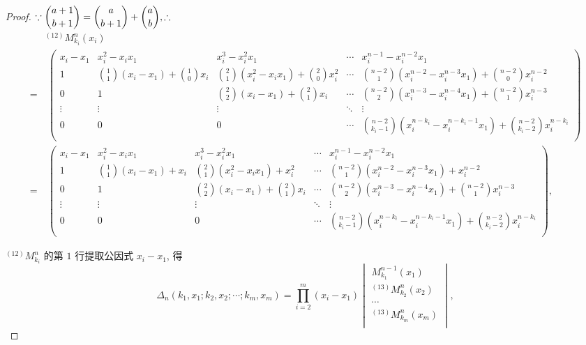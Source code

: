 \documentclass{ctexart}
\begin{document}
\begin{proof}
    $\because\dbinom{a+1}{b+1}=\dbinom{a}{b+1}+\dbinom{a}{b},\therefore$
    \begin{align*}
        & ^{(12)}M_{k_i}^n(x_i) \\
        = & \ \begin{pmatrix}
            x_i-x_1 & x_i^2-x_ix_1 & x_i^3-x_i^2x_1 & \cdots & x_i^{n-1}-x_i^{n-2}x_1 \\[4pt]
            1 & \binom{1}{1}(x_i-x_1)+\binom{1}{0}x_i & \binom{2}{1}(x_i^2-x_ix_1)+\binom{2}{0}x_i^2 & \cdots & \binom{n-2}{1}(x_i^{n-2}-x_i^{n-3}x_1)+\binom{n-2}{0}x_i^{n-2} \\[10pt]
            0 & 1 & \binom{2}{2}(x_i-x_1)+\binom{2}{1}x_i & \cdots & \binom{n-2}{2}(x_i^{n-3}-x_i^{n-4}x_1)+\binom{n-2}{1}x_i^{n-3} \\
            \vdots & \vdots & \vdots & \ddots & \vdots \\[4pt]
            0 & 0 & 0 & \cdots & \binom{n-2}{k_i-1}(x_i^{n-k_i}-x_i^{n-k_i-1}x_1)+\binom{n-2}{k_i-2}x_i^{n-k_i} \\
        \end{pmatrix} \\
        = & \ \begin{pmatrix}
            x_i-x_1 & x_i^2-x_ix_1 & x_i^3-x_i^2x_1 & \cdots & x_i^{n-1}-x_i^{n-2}x_1 \\[4pt]
            1 & \binom{1}{1}(x_i-x_1)+x_i & \binom{2}{1}(x_i^2-x_ix_1)+x_i^2 & \cdots & \binom{n-2}{1}(x_i^{n-2}-x_i^{n-3}x_1)+x_i^{n-2} \\[10pt]
            0 & 1 & \binom{2}{2}(x_i-x_1)+\binom{2}{1}x_i & \cdots & \binom{n-2}{2}(x_i^{n-3}-x_i^{n-4}x_1)+\binom{n-2}{1}x_i^{n-3} \\
            \vdots & \vdots & \vdots & \ddots & \vdots \\[4pt]
            0 & 0 & 0 & \cdots & \binom{n-2}{k_i-1}(x_i^{n-k_i}-x_i^{n-k_i-1}x_1)+\binom{n-2}{k_i-2}x_i^{n-k_i} \\
        \end{pmatrix},
    \end{align*}

    $^{(12)}M_{k_i}^n$ 的第 $1$ 行提取公因式 $x_i-x_1$, 得
    \[\Delta_n(k_1,x_1;k_2,x_2;\cdots;k_m,x_m)=\prod\limits_{i=2}^m(x_i-x_1)\begin{vmatrix}
        M_{k_1}^{n-1}(x_1) \\
        ^{(13)}M_{k_2}^n(x_2) \\
        \cdots \\
        ^{(13)}M_{k_m}^n(x_m) \\
    \end{vmatrix},\]


\end{proof}
\end{document}
